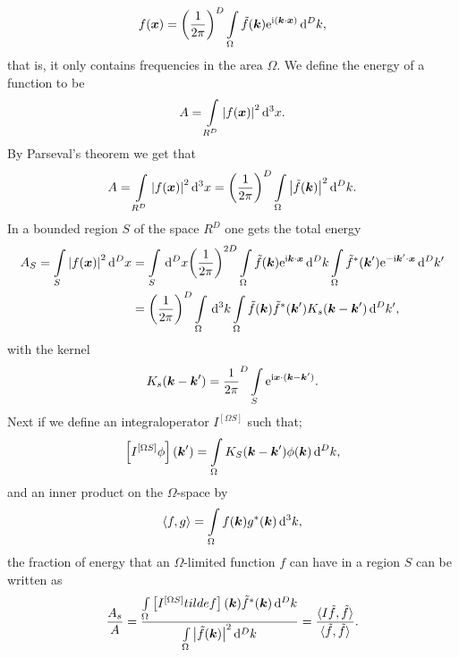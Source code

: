 \documentclass[11pt,a4paper, 
english, swedish %
]{article}
\begin{document}
\begin{equation}
  f(\vb*x)=\qty(\frac{1}{2\pi})^D\int_\Omega \tilde{f}(\vb*k)\ee^{\ii(\vb*k \cdot \vb*x)} \id^Dk,
\end{equation}
that is, it only contains frequencies in the area $\Omega$.
We define the energy of a function to be
\begin{equation*}
A=\int_{R^D}\abs{f(\vb*x)}^2\id^3x.
\end{equation*}
By Parseval's theorem we get that
\begin{equation*}
A=\int_{R^D}\abs{f(\vb*x)}^2\id^3x=\qty(\frac{1}{2\pi})^D \int_\Omega \abs{\tilde{f}(\vb*k)}^2 \id^Dk.
\end{equation*}
In a bounded region $S$ of the space $R^D$ one gets the total energy
\begin{align*}
  A_S=\int_S\abs{f(\vb*x)}^2\id^Dx&=\int_S\id^Dx \qty(\frac{1}{2\pi})^{2D}\int_\Omega \tilde{f}(\vb*k)\ee^{\ii\vb*k\cdot \vb*x}\id^Dk \int_\Omega \tilde{f}^*(\vb*k')\ee^{-\ii\vb*k'\cdot \vb*x}\id^Dk'\\
 & =\qty (\frac{1}{2\pi})^D \int_\Omega\id^3k\int_\Omega\tilde{f}(\vb*k)\tilde{f}^*(\vb*k')K_s(\vb*k-\vb*k')\id^Dk',
\end{align*}
with the kernel
\begin{equation}
  \label{eq:kernel}
K_s(\vb*k-\vb*k')=\frac{1}{2\pi}^D\int_S\ee^{\ii\vb*x \cdot(\vb*k-\vb*k')}.
\end{equation}
Next if we define an integraloperator $I^{[\Omega S]}$ such that;
\begin{equation}
  \label{eq:int_op}
\qty[I^{[\Omega S]}\phi](\vb*k')=\int_\Omega K_S(\vb*k-\vb*k')\phi(\vb*k)\id^Dk,
\end{equation}
and an inner product on the $\Omega$-space by
\begin{equation}
  \label{eq:in_prod}
   \langle f,g\rangle =\int_\Omega f(\vb*k)g^*(\vb*k)\id^3k,
\end{equation}
the fraction of energy that an $\Omega$-limited function $f$ can have in a region $S$ can be written as
\begin{equation}
  \label{eq:energy_frac_final}
\frac{A_s}{A}=\frac{\int_\Omega\qty[I^{[\Omega S]}tilde{f}](\vb*k)\tilde{f}^*(\vb*k)\id^Dk}{\int_\Omega \abs{\tilde{f}(\vb*k)}^2 \id^Dk}=\frac{ \langle I\tilde{f}, \tilde{f}\rangle}{\langle \tilde{f}, \tilde{f} \rangle}.
\end{equation}
\end{document}
